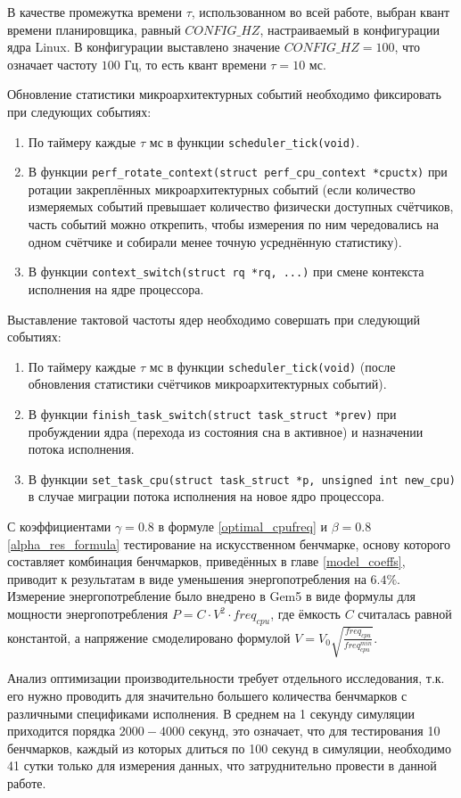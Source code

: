     В качестве промежутка времени $\tau$, использованном во всей работе, выбран квант времени планировщика,
    равный $CONFIG\_HZ$, настраиваемый в конфигурации ядра Linux. В конфигурации выставлено значение
    $CONFIG\_HZ = 100$, что означает частоту $100$ Гц, то есть квант времени $\tau = 10$ мс.

    Обновление статистики микроархитектурных событий необходимо фиксировать при следующих событиях:
    \begin{enumerate}
        \item По таймеру каждые $\tau$ мс в функции \lstinline{scheduler_tick(void)}.
        \item В функции \lstinline{perf_rotate_context(struct perf_cpu_context *cpuctx)} при ротации
        закреплённых микроархитектурных событий (если количество измеряемых событий
        превышает количество физически доступных счётчиков, часть событий можно открепить, чтобы измерения по ним
        чередовались на одном счётчике и собирали менее точную усреднённую статистику).
        \item В функции \lstinline{context_switch(struct rq *rq, ...)} при смене контекста исполнения на
        ядре процессора.
    \end{enumerate}

    Выставление тактовой частоты ядер необходимо совершать при следующий событиях:
    \begin{enumerate}
        \item По таймеру каждые $\tau$ мс в функции \lstinline{scheduler_tick(void)} (после обновления статистики
        счётчиков микроархитектурных событий).
        \item В функции \lstinline{finish_task_switch(struct task_struct *prev)} при пробуждении ядра
        (перехода из состояния сна в активное) и назначении потока исполнения.
        \item В функции \lstinline{set_task_cpu(struct task_struct *p, unsigned int new_cpu)} в случае миграции
        потока исполнения на новое ядро процессора.
    \end{enumerate}

    С коэффициентами $\gamma = 0.8$ в формуле \eqref{optimal_cpufreq} и $\beta = 0.8$ \eqref{alpha_res_formula}
    тестирование на искусственном бенчмарке, основу которого составляет комбинация бенчмарков, приведённых в
    главе \ref{model_coeffs}, приводит к результатам в виде уменьшения энергопотребления на $6.4\%$. Измерение
    энергопотребление было внедрено в Gem5 в виде формулы для мощности энергопотребления $P = C \cdot V^2 \cdot freq_{cpu}$,
    где ёмкость $C$ считалась равной константой, а напряжение смоделировано формулой
    $V = V_0 \sqrt{\frac{freq_{cpu}}{freq_{cpu}^{min}}}$.

    Анализ оптимизации производительности требует отдельного исследования, т.к. его нужно проводить для значительно
    большего количества бенчмарков с различными спецификами исполнения. В среднем на 1 секунду симуляции приходится
    порядка $2000-4000$ секунд, это означает, что для тестирования 10 бенчмарков, каждый из которых длиться
    по 100 секунд в симуляции, необходимо 41 сутки только для измерения данных, что затруднительно провести в данной работе.

\newpage

